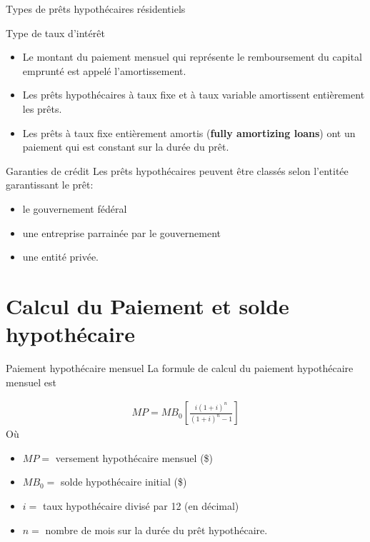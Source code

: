 \documentclass{beamer}
\begin{document}
\begin{frame}{Types de prêts hypothécaires résidentiels}
\begin{block}{Type de taux d'intérêt}
\begin{itemize}[label=\bullet]
\item Le montant du paiement mensuel qui représente le remboursement du capital emprunté est appelé l'amortissement.
\item Les prêts hypothécaires à taux fixe et à taux variable amortissent entièrement les prêts.
\item Les prêts à taux fixe entièrement amortis (\textbf{fully amortizing loans}) ont un paiement qui est constant sur la durée du prêt. 
\end{itemize}
\end{block}
\begin{block}{Garanties de crédit}
Les prêts hypothécaires peuvent être classés selon l'entitée garantissant le prêt: 
\begin{itemize}[label=\bullet]
\item le gouvernement fédéral
\item une entreprise parrainée par le gouvernement 
\item une entité privée. 
\end{itemize}
\end{block}
\end{frame}



\section{Calcul du Paiement et solde hypothécaire}

\begin{frame}{Paiement hypothécaire mensuel}
La formule de calcul du paiement hypothécaire mensuel est

\begin{align*}
MP=MB_0 \left[ \frac{i(1+i)^n}{(1+i)^n-1} \right]
\end{align*}
Où
\begin{itemize}[label=\bullet]
\item $MP =$ versement hypothécaire mensuel (\$)
\item $MB_0 =$ solde hypothécaire initial (\$)
\item $i =$ taux hypothécaire divisé par 12 (en décimal)
\item $n =$ nombre de mois sur la durée du prêt hypothécaire.
\end{itemize}
\end{frame}
\end{document}
